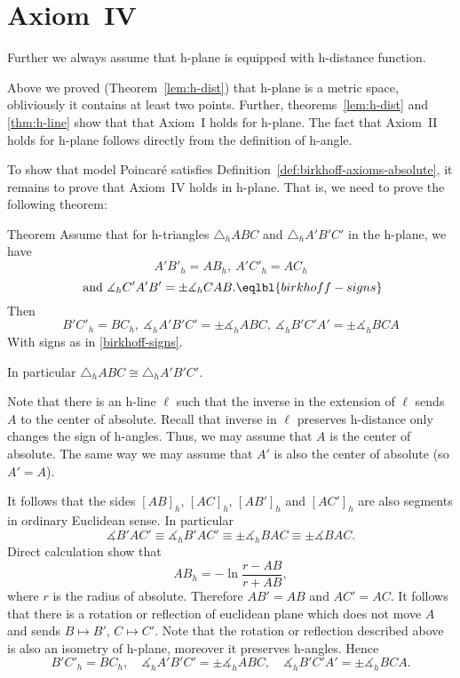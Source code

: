 \section*{Axiom~IV}

Further we always assume that h-plane is equipped with h-distance function.

Above we proved (Theorem~\ref{lem:h-dist}) that h-plane is a metric space, obliviously it contains at least two points.
Further, theorems~\ref{lem:h-dist} and \ref{thm:h-line} show that that Axiom~I holds for h-plane.
The fact that Axiom~II holds for h-plane follows directly from the definition of h-angle.

To show that model Poincar\'e satisfies Definition~\ref{def:birkhoff-axioms-absolute},
it remains to prove that Axiom~IV holds in h-plane.
That is, we need to prove the following theorem:

\begin{thm}{Theorem}
Assume that for h-triangles $\triangle_h A B C$ and $\triangle_h A' B' C'$ in the h-plane, we have
$$A' B'_h= A B_h,
\ A' C'_h= A C_h$$
$$\ \text{and}\ 
\measuredangle_h C' A' B'=\pm\measuredangle_h C A B.\eqlbl{birkhoff-signs}$$
Then 
$$ B' C'_h= B C_h,
\ \measuredangle_h A' B' C'=\pm\measuredangle_h A B C,
\ \measuredangle_h B' C' A'=\pm\measuredangle_h B  C A $$
With signs as in \ref{birkhoff-signs}.

In particular $\triangle_h A B C\cong\triangle_h A' B' C'$.
\end{thm}


Note that there is an h-line $\ell$ such that the inverse in the extension of $\ell$ sends $A$ to the center of absolute.
Recall that inverse in $\ell$ preserves h-distance only changes the sign of h-angles.%
Thus, we may assume that $A$ is the center of absolute.
The same way we may assume that $A'$ is also the center of absolute (so $A'=A$).

It follows that the sides $[AB]_h$, $[AC]_h$, $[AB']_h$ and $[AC']_h$ are also segments in ordinary Euclidean sense.
In particular 
$$\measuredangle B'AC'\equiv\measuredangle_h B'AC'\equiv\pm\measuredangle_h BAC\equiv\pm\measuredangle BAC.$$
Direct calculation show that 
$$AB_h=-\ln\frac{r-AB}{r+AB},$$
where $r$ is the radius of absolute.
Therefore $A B'=AB$ and $A C'=AC$.
It follows that there is a rotation or reflection of euclidean plane which does not move $A$ and sends $B\mapsto B'$, $C\mapsto C'$.
Note that the rotation or reflection described above is also an isometry of h-plane,
moreover it preserves h-angles.
Hence   
$$ B' C'_h= B C_h,
\quad
\measuredangle_h A' B' C'
=
\pm\measuredangle_h A B C,
\quad
\measuredangle_h B' C' A'
=
\pm\measuredangle_h B  C A.
$$
\qedsf














